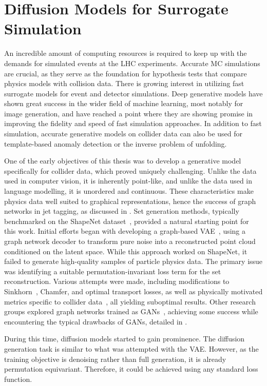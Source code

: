 \chapter{Diffusion Models for Surrogate Simulation}
\label{ch:jet_generation}

An incredible amount of computing resources is required to keep up with the demands for simulated events at the LHC experiments.
Accurate MC simulations are crucial, as they serve as the foundation for hypothesis tests that compare physics models with collision data.
There is growing interest in utilizing fast surrogate models for event and detector simulations.
Deep generative models have shown great success in the wider field of machine learning, most notably for image generation, and have reached a point where they are showing promise in improving the fidelity and speed of fast simulation approaches.
In addition to fast simulation, accurate generative models on collider data can also be used for template-based anomaly detection or the inverse problem of unfolding.

One of the early objectives of this thesis was to develop a generative model specifically for collider data, which proved uniquely challenging.
Unlike the data used in computer vision, it is inherently point-like, and unlike the data used in language modelling, it is unordered and continuous.
These characteristics make physics data well suited to graphical representations, hence the success of graph networks in jet tagging, as discussed in .
Set generation methods, typically benchmarked on the ShapeNet dataset~\cite{ShapeNet}, provided a natural starting point for this work.
Initial efforts began with developing a graph-based VAE~\cite{SetVAE}, using a graph network decoder to transform pure noise into a reconstructed point cloud conditioned on the latent space.
While this approach worked on ShapeNet, it failed to generate high-quality samples of particle physics data.
The primary issue was identifying a suitable permutation-invariant loss term for the set reconstruction.
Various attempts were made, including modifications to Sinkhorn~\cite{Sinkhorn}, Chamfer, and optimal transport losses, as well as physically motivated metrics specific to collider data~\cite{MetricSpaceCollider}, all yielding suboptimal results.
Other research groups explored graph networks trained as GANs~\cite{MPGAN, EPICGAN}, achieving some success while encountering the typical drawbacks of GANs, detailed in .

During this time, diffusion models started to gain prominence.
The diffusion generation task is similar to what was attempted with the VAE\@.
However, as the training objective is denoising rather than full generation, it is already permutation equivariant.
Therefore, it could be achieved using any standard loss function.

